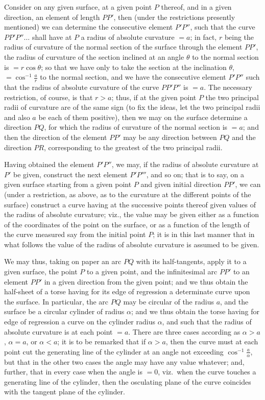 \documentclass[11pt,a4paper]{article}
\begin{document}
Consider on any given surface, at a given point $P$ thereof, and in a given direction, an element of length $PP'$, then (under the restrictions presently mentioned) we can determine the consecutive element $P'P''$, such that the curve $PP'P''\ldots$ shall have at $P$ a radius of absolute curvature $= a$; in fact, $r$ being the radius of curvature of the normal section of the surface through the element $PP'$, the radius of curvature of the section inclined at an angle $\theta$ to the normal section is $= r \cos\theta$; so that we have only to take the section at the inclination $\theta$, $= \cos^{-1} \frac{a}{r}$ to the normal section, and we have the consecutive element $P'P''$ such that the radius of absolute curvature of the curve $PP'P''$ is $= a$. The necessary restriction, of course, is that $r > a$; thus, if at the given point $P$ the two principal radii of curvature are of the same sign (to fix the ideas, let the two principal radii and also $a$ be each of them positive), then we may on the surface determine a direction $PQ$, for which the radius of curvature of the normal section is $= a$; and then the direction of the element $PP'$ may be any direction between $PQ$ and the direction $PR$, corresponding to the greatest of the two principal radii.

Having obtained the element $P'P''$, we may, if the radius of absolute curvature at $P'$ be given, construct the next element $P'P'''$, and so on; that is to say, on a given surface starting from a given point $P$ and given initial direction $PP'$, we can (under a restriction, as above, as to the curvature at the different points of the surface) construct a curve having at the successive points thereof given values of the radius of absolute curvature; viz., the value may be given either as a function of the coordinates of the point on the surface, or as a function of the length of the curve measured say from the initial point $P$; it is in this last manner that in what follows the value of the radius of absolute curvature is assumed to be given.

We may thus, taking on paper an arc $PQ$ with its half-tangents, apply it to a given surface, the point $P$ to a given point, and the infinitesimal arc $PP'$ to an element $PP'$ in a given direction from the given point; and we thus obtain the half-sheet of a torse having for its edge of regression a determinate curve upon the surface. In particular, the arc $PQ$ may be circular of the radius $a$, and the surface be a circular cylinder of radius $\alpha$; and we thus obtain the torse having for edge of regression a curve on the cylinder radius $\alpha$, and such that the radius of absolute curvature is at each point $= a$. There are three cases according as $\alpha > a$, $\alpha = a$, or $\alpha < a$; it is to be remarked that if $\alpha > a$, then the curve must at each point cut the generating line of the cylinder at an angle not exceeding $\cos^{-1} \frac{a}{\alpha}$, but that in the other two cases the angle may have any value whatever; and, further, that in every case when the angle is $= 0$, viz.\ when the curve touches a generating line of the cylinder, then the osculating plane of the curve coincides with the tangent plane of the cylinder.
\end{document}
